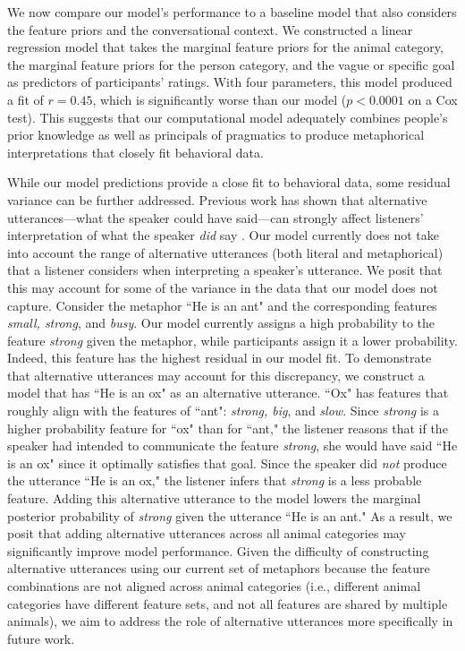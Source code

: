 \documentclass[10pt,letterpaper]{article}
\begin{document}
We now compare our model's performance to a baseline model that also considers the feature priors and the conversational context. We constructed a linear regression model that takes the marginal feature priors for the animal category, the marginal feature priors for the person category, and the vague or specific goal as predictors of participants' ratings. With four parameters, this model produced a fit of $r= 0.45$, which is significantly worse than our model ($p < 0.0001$ on a Cox test). This suggests that our computational model adequately combines people's prior knowledge as well as principals of pragmatics to produce metaphorical interpretations that closely fit behavioral data.

While our model predictions provide a close fit to behavioral data, some residual variance can be further addressed. Previous work has shown that alternative utterances---what the speaker could have said---can strongly affect listeners' interpretation of what the speaker \emph{did} say \cite{bergen2012s}. Our model currently does not take into account the range of alternative utterances (both literal and metaphorical) that a listener considers when interpreting a speaker's utterance. We posit that this may account for some of the variance in the data that our model does not capture. Consider the metaphor ``He is an ant" and the corresponding features \emph{small, strong}, and \emph{busy}. Our model currently assigns a high probability to the feature \emph{strong} given the metaphor, while participants assign it a lower probability. Indeed, this feature has the highest residual in our model fit. To demonstrate that alternative utterances may account for this discrepancy, we construct a model that has ``He is an ox" as an alternative utterance. ``Ox" has features that roughly align with the features of ``ant": \emph{strong, big}, and \emph{slow}. Since \emph{strong} is a higher probability feature for ``ox" than for ``ant," the listener reasons that if the speaker had intended to communicate the feature \emph{strong}, she would have said ``He is an ox" since it optimally satisfies that goal. Since the speaker did \emph{not} produce the utterance ``He is an ox," the listener infers that \emph{strong} is a less probable feature. Adding this alternative utterance to the model lowers the marginal posterior probability of \emph{strong} given the utterance ``He is an ant." As a result, we posit that adding alternative utterances across all animal categories may significantly improve model performance. Given the difficulty of constructing alternative utterances using our current set of metaphors because the feature combinations are not aligned across animal categories (i.e., different animal categories have different feature sets, and not all features are shared by multiple animals), we aim to address the role of alternative utterances more specifically in future work.
\end{document}
